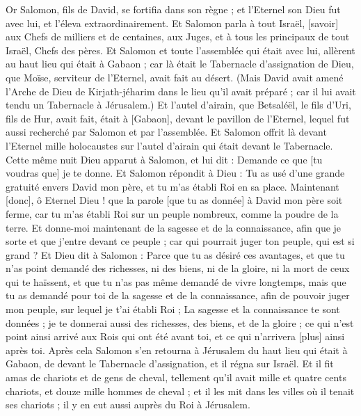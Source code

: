 \BFont
\begin{multicols}{2}
\VerseOne{}Or Salomon, fils de David, se fortifia dans son règne ; et l'Eternel son Dieu fut avec lui, et l'éleva extraordinairement.
Et Salomon parla à tout Israël, [savoir] aux Chefs de milliers et de centaines, aux Juges, et à tous les principaux de tout Israël, Chefs des pères.
Et Salomon et toute l'assemblée qui était avec lui, allèrent au haut lieu qui était à Gabaon ; car là était le Tabernacle d'assignation de Dieu, que Moïse, serviteur de l'Eternel, avait fait au désert.
(Mais David avait amené l'Arche de Dieu de Kirjath-jéharim dans le lieu qu'il avait préparé ; car il lui avait tendu un Tabernacle à Jérusalem.)
Et l'autel d'airain, que Betsaléël, le fils d'Uri, fils de Hur, avait fait, était à [Gabaon], devant le pavillon de l'Eternel, lequel fut aussi recherché par Salomon et par l'assemblée.
Et Salomon offrit là devant l'Eternel mille holocaustes sur l'autel d'airain qui était devant le Tabernacle.
Cette même nuit Dieu apparut à Salomon, et lui dit : Demande ce que [tu voudras que] je te donne.
Et Salomon répondit à Dieu : Tu as usé d'une grande gratuité envers David mon père, et tu m'as établi Roi en sa place.
Maintenant [donc], ô Eternel Dieu ! que la parole [que tu as donnée] à David mon père soit ferme, car tu m'as établi Roi sur un peuple nombreux, comme la poudre de la terre.
Et donne-moi maintenant de la sagesse et de la connaissance, afin que je sorte et que j'entre devant ce peuple ; car qui pourrait juger ton peuple, qui est si grand ?
Et Dieu dit à Salomon : Parce que tu as désiré ces avantages, et que tu n'as point demandé des richesses, ni des biens, ni de la gloire, ni la mort de ceux qui te haïssent, et que tu n'as pas même demandé de vivre longtemps, mais que tu as demandé pour toi de la sagesse et de la connaissance, afin de pouvoir juger mon peuple, sur lequel je t'ai établi Roi ;
La sagesse et la connaissance te sont données ; je te donnerai aussi des richesses, des biens, et de la gloire ; ce qui n'est point ainsi arrivé aux Rois qui ont été avant toi, et ce qui n'arrivera [plus] ainsi après toi.
Après cela Salomon s'en retourna à Jérusalem du haut lieu qui était à Gabaon, de devant le Tabernacle d'assignation, et il régna sur Israël.
Et il fit amas de chariots et de gens de cheval, tellement qu'il avait mille et quatre cents chariots, et douze mille hommes de cheval ; et il les mit dans les villes où il tenait ses chariots ; il y en eut aussi auprès du Roi à Jérusalem.

\end{multicols}

